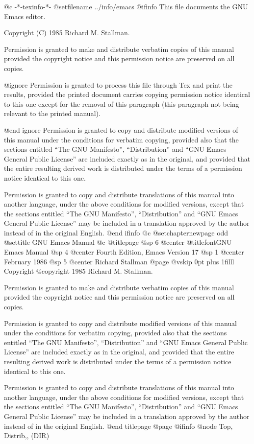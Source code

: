   @c -*-texinfo-*-
@setfilename ../info/emacs
@ifinfo
This file documents the GNU Emacs editor.

Copyright (C) 1985 Richard M. Stallman.

Permission is granted to make and distribute verbatim copies of
this manual provided the copyright notice and this permission notice
are preserved on all copies.

@ignore
Permission is granted to process this file through Tex and print the
results, provided the printed document carries copying permission
notice identical to this one except for the removal of this paragraph
(this paragraph not being relevant to the printed manual).

@end ignore
Permission is granted to copy and distribute modified versions of this
manual under the conditions for verbatim copying, provided also that the
sections entitled ``The GNU Manifesto'', ``Distribution'' and ``GNU Emacs
General Public License'' are included exactly as in the original, and
provided that the entire resulting derived work is distributed under the
terms of a permission notice identical to this one.

Permission is granted to copy and distribute translations of this manual
into another language, under the above conditions for modified versions,
except that the sections entitled ``The GNU Manifesto'', ``Distribution''
and ``GNU Emacs General Public License'' may be included in a translation
approved by the author instead of in the original English.
@end ifinfo
@c
@setchapternewpage odd
@settitle GNU Emacs Manual
@c
@titlepage
@sp 6
@center @titlefont{GNU Emacs Manual}
@sp 4
@center Fourth Edition, Emacs Version 17
@sp 1
@center February 1986
@sp 5
@center Richard Stallman
@page
@vskip 0pt plus 1filll
Copyright @copyright{} 1985 Richard M. Stallman.

Permission is granted to make and distribute verbatim copies of
this manual provided the copyright notice and this permission notice
are preserved on all copies.

Permission is granted to copy and distribute modified versions of this
manual under the conditions for verbatim copying, provided also that the
sections entitled ``The GNU Manifesto'', ``Distribution'' and ``GNU Emacs
General Public License'' are included exactly as in the original, and
provided that the entire resulting derived work is distributed under the
terms of a permission notice identical to this one.

Permission is granted to copy and distribute translations of this manual
into another language, under the above conditions for modified versions,
except that the sections entitled ``The GNU Manifesto'', ``Distribution''
and ``GNU Emacs General Public License'' may be included in a translation
approved by the author instead of in the original English.
@end titlepage
@page
@ifinfo
@node Top, Distrib,, (DIR)

